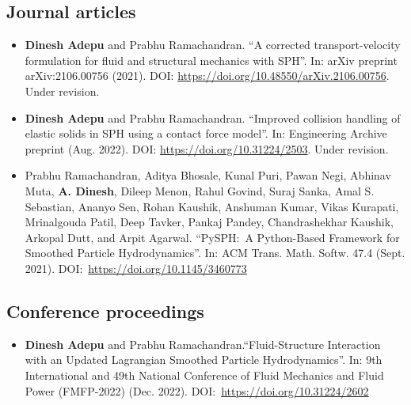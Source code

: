 \listofpublications

\subsection*{Journal articles}

\begin{itemize}
\item \textbf{Dinesh Adepu} and Prabhu Ramachandran. ``A corrected
  transport-velocity formulation for fluid and structural mechanics with
  SPH''. In: arXiv preprint arXiv:2106.00756
  (2021). DOI: \url{https://doi.org/10.48550/arXiv.2106.00756}. Under revision.


\item \textbf{Dinesh Adepu} and Prabhu Ramachandran. ``Improved collision
  handling of elastic solids in SPH using a contact force model''. In:
  Engineering Archive preprint
  (Aug. 2022). DOI: \url{https://doi.org/10.31224/2503}. Under revision.

\item Prabhu Ramachandran, Aditya Bhosale, Kunal Puri, Pawan Negi, Abhinav Muta,
  \textbf{A. Dinesh}, Dileep Menon, Rahul Govind, Suraj Sanka, Amal S. Sebastian, Ananyo
  Sen, Rohan Kaushik, Anshuman Kumar, Vikas Kurapati, Mrinalgouda Patil, Deep
  Tavker, Pankaj Pandey, Chandrashekhar Kaushik, Arkopal Dutt, and Arpit
  Agarwal. ``PySPH:~A Python-Based Framework for Smoothed Particle
  Hydrodynamics''. In: ACM Trans. Math. Softw. 47.4
  (Sept. 2021). DOI:~\url{https://doi.org/10.1145/3460773}
\end{itemize}


\subsection*{Conference proceedings}
\label{sec:conf-proc}
\begin{itemize}
\item \textbf{Dinesh Adepu} and Prabhu Ramachandran.``Fluid-Structure
  Interaction with an Updated Lagrangian Smoothed Particle Hydrodynamics''. In:
  9th International and 49th National Conference of Fluid Mechanics and Fluid
  Power (FMFP-2022) (Dec. 2022). DOI:~\url{https://doi.org/10.31224/2602}
\end{itemize}

